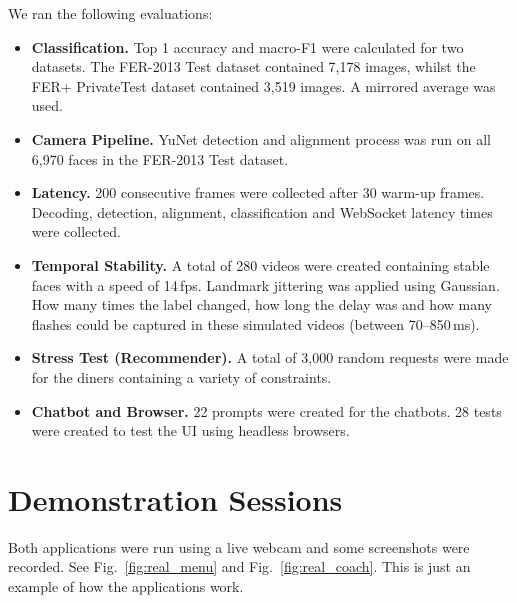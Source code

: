 \documentclass[conference]{IEEEtran}
\begin{document}
We ran the following evaluations:
\begin{itemize}
    \item \textbf{Classification.} Top 1 accuracy and macro-F1 were calculated for two datasets. The FER-2013 Test dataset contained 7,178 images, whilst the FER+ PrivateTest dataset contained 3,519 images. A mirrored average was used.
    \item \textbf{Camera Pipeline.} YuNet detection and alignment process was run on all 6,970 faces in the FER-2013 Test dataset.
    \item \textbf{Latency.} 200 consecutive frames were collected after 30 warm-up frames. Decoding, detection, alignment, classification and WebSocket latency times were collected.
    \item \textbf{Temporal Stability.} A total of 280 videos were created containing stable faces with a speed of 14\,fps. Landmark jittering was applied using Gaussian. How many times the label changed, how long the delay was and how many flashes could be captured in these simulated videos (between 70--850\,ms).
    \item \textbf{Stress Test (Recommender).} A total of 3,000 random requests were made for the diners containing a variety of constraints.
    \item \textbf{Chatbot and Browser.} 22 prompts were created for the chatbots. 28 tests were created to test the UI using headless browsers.
\end{itemize}

\section{Demonstration Sessions}
Both applications were run using a live webcam and some screenshots were recorded. See Fig.~\ref{fig:real_menu} and Fig.~\ref{fig:real_coach}. This is just an example of how the applications work.
\end{document}
